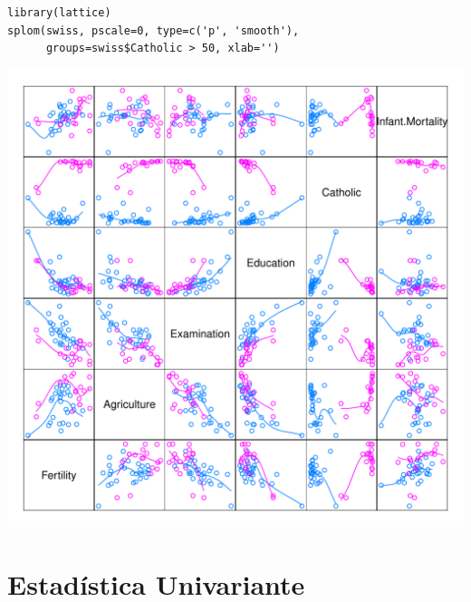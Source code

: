 \documentclass[xcolor={usenames,svgnames,dvipsnames}]{beamer}
\begin{document}
\begin{frame}[fragile,label=sec-1-3]{}
 \lstset{language=R,numbers=none}
\begin{lstlisting}
library(lattice)
splom(swiss, pscale=0, type=c('p', 'smooth'),
      groups=swiss$Catholic > 50, xlab='')
\end{lstlisting}

\includegraphics[width=.9\linewidth]{figs/splomSwiss.pdf}
\end{frame}
\section{Estadística Univariante}
\label{sec-2}
\end{document}
